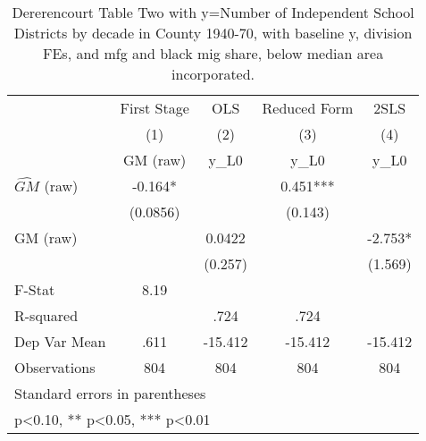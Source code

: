 \begin{table}[htbp]\centering
\def\sym#1{\ifmmode^{#1}\else\(^{#1}\)\fi}
\caption{Dererencourt Table Two with y=Number of Independent School Districts by decade in County 1940-70, with baseline y, division FEs, and mfg and black mig share, below median area incorporated.}
\begin{tabular}{l*{4}{c}}
\toprule
                    & First Stage   &         OLS   &Reduced Form   &        2SLS   \\
                    &\multicolumn{1}{c}{(1)}&\multicolumn{1}{c}{(2)}&\multicolumn{1}{c}{(3)}&\multicolumn{1}{c}{(4)}\\
                    &\multicolumn{1}{c}{GM  (raw)}&\multicolumn{1}{c}{y\_L0}&\multicolumn{1}{c}{y\_L0}&\multicolumn{1}{c}{y\_L0}\\
\midrule
$\hat{GM}$ (raw)    &      -0.164*  &               &       0.451***&               \\
                    &    (0.0856)   &               &     (0.143)   &               \\
\addlinespace
GM  (raw)           &               &      0.0422   &               &      -2.753*  \\
                    &               &     (0.257)   &               &     (1.569)   \\
\midrule
F-Stat              &        8.19   &               &               &               \\
R-squared           &               &        .724   &        .724   &               \\
Dep Var Mean        &        .611   &     -15.412   &     -15.412   &     -15.412   \\
Observations        &         804   &         804   &         804   &         804   \\
\bottomrule
\multicolumn{5}{l}{\footnotesize Standard errors in parentheses}\\
\multicolumn{5}{l}{\footnotesize * p<0.10, ** p<0.05, *** p<0.01}\\
\end{tabular}
\end{table}
